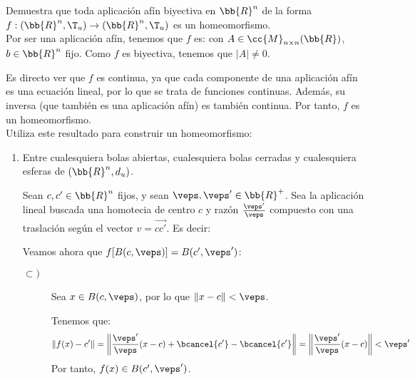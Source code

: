 \begin{ejercicio}
    Demuestra que toda aplicación afín biyectiva en $\bb{R}^n$ de la forma $f : (\bb{R}^n, \T_u) \to (\bb{R}^n, \T_u)$ es un homeomorfismo.\\

    Por ser una aplicación afín, tenemos que $f$ es:
    con $A\in \cc{M}_{n\times n}(\bb{R})$, $b\in \bb{R}^n$ fijo. Como $f$ es biyectiva, tenemos que $|A|\neq 0$.

    Es directo ver que $f$ es continua, ya que cada componente de una aplicación afín es una ecuación lineal, por lo que se trata de funciones continuas. Además, su inversa (que también es una aplicación afín) es también continua. Por tanto, $f$ es un homeomorfismo.\\
    
    
    Utiliza este resultado para construir un homeomorfismo:
    \begin{enumerate}
        \item Entre cualesquiera bolas abiertas, cualesquiera bolas cerradas y cualesquiera esferas de $(\bb{R}^n, d_u)$.

        Sean $c,c'\in \bb{R}^n$ fijos, y sean $\veps,\veps'\in \bb{R}^+$. Sea la aplicación lineal buscada una homotecia de centro $c$ y razón $\frac{\veps'}{\veps}$ compuesto con una traslación según el vector $v=\vec{cc'}$. Es decir:

        Veamos ahora que $f[B(c,\veps)]=B(c',\veps')$:
        \begin{description}
            \item[$\subset)$] Sea $x\in B(c,\veps)$, por lo que $\|x-c\|<\veps$.

            Tenemos que:
            \begin{equation*}
                \|f(x)-c'\| = \left\|\dfrac{\veps'}{\veps}(x-c) + \bcancel{c'}-\bcancel{c'}\right\| =  \left\|\dfrac{\veps'}{\veps}(x-c)\right\| < \veps'
            \end{equation*}
            Por tanto, $f(x)\in B(c',\veps')$.


\end{description}
\end{enumerate}
\end{ejercicio}
